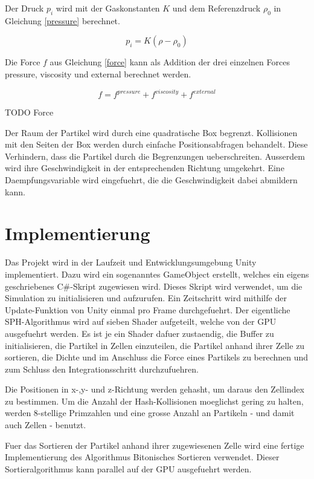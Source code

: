 \documentclass[a4paper]{paper}
\begin{document}
Der Druck $p_i$ wird mit der Gaskonstanten $K$ und dem Referenzdruck $\rho_0$ in Gleichung \ref{pressure} berechnet.

\begin{equation}
\label{pressure}
p_i=K(\rho-\rho_0)
\end{equation}

Die Force $f$ aus Gleichung \ref{force} kann als Addition der drei einzelnen Forces pressure, viscosity und external berechnet werden.

\begin{equation}
\label{force}
f = f^{pressure} + f^{viscosity} + f^{external}
\end{equation}

TODO Force

Der Raum der Partikel wird durch eine quadratische Box begrenzt. Kollisionen mit den Seiten der Box werden durch einfache Positionsabfragen behandelt. Diese Verhindern, dass die Partikel durch die Begrenzungen ueberschreiten. Ausserdem wird ihre Geschwindigkeit in der entsprechenden Richtung umgekehrt. Eine Daempfungsvariable wird eingefuehrt, die die Geschwindigkeit dabei abmildern kann.

\section{Implementierung}
Das Projekt wird in der Laufzeit und Entwicklungsumgebung Unity implementiert. Dazu wird ein sogenanntes GameObject erstellt, welches ein eigens geschriebenes C\#-Skript zugewiesen wird. Dieses Skript wird verwendet, um die Simulation zu initialisieren und aufzurufen. %
Ein Zeitschritt wird mithilfe der Update-Funktion von Unity einmal pro Frame durchgefuehrt. Der eigentliche SPH-Algorithmus wird auf sieben Shader aufgeteilt, welche von der GPU ausgefuehrt werden. Es ist je ein Shader dafuer zustaendig, die Buffer zu initialisieren, die Partikel in Zellen einzuteilen, die Partikel anhand ihrer Zelle zu sortieren, die Dichte und im Anschluss die Force eines Partikels zu berechnen und zum Schluss den Integrationsschritt durchzufuehren.

Die Positionen in x-,y- und z-Richtung werden gehasht, um daraus den Zellindex zu bestimmen. Um die Anzahl der Hash-Kollisionen moeglichst gering zu halten, werden 8-stellige Primzahlen und eine grosse Anzahl an Partikeln - und damit auch Zellen - benutzt.

Fuer das Sortieren der Partikel anhand ihrer zugewiesenen Zelle wird eine fertige Implementierung des Algorithmus Bitonisches Sortieren verwendet. Dieser Sortieralgorithmus kann parallel auf der GPU ausgefuehrt werden.
\end{document}
